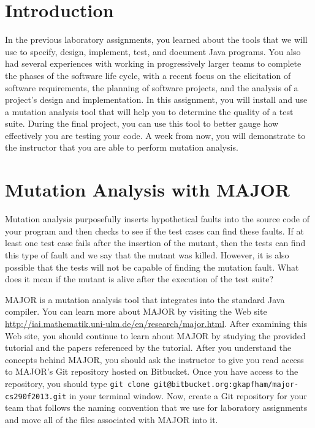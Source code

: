 

\usepackage[compact]{titlesec}



\section*{Introduction}

In the previous laboratory assignments, you learned about the tools that we will use to specify, design, implement,
test, and document Java programs.  You also had several experiences with working in progressively larger teams to
complete the phases of the software life cycle, with a recent focus on the elicitation of software requirements, the
planning of software projects, and the analysis of a project's design and implementation.  In this assignment, you will
install and use a mutation analysis tool that will help you to determine the quality of a test suite.  During the final
project, you can use this tool to better gauge how effectively you are testing your code. A week from now, you will
demonstrate to the instructor that you are able to perform mutation analysis.

\section*{Mutation Analysis with MAJOR}

Mutation analysis purposefully inserts hypothetical faults into the source code of your program and then checks to see
if the test cases can find these faults.  If at least one test case fails after the insertion of the mutant, then
the tests can find this type of fault and we say that the mutant was killed.  However, it is also possible that the
tests will not be capable of finding the mutation fault. What does it mean if the mutant is alive after the execution of
the test suite?

MAJOR is a mutation analysis tool that integrates into the standard Java compiler. You can learn more about MAJOR by
visiting the Web site \url{http://iai.mathematik.uni-ulm.de/en/research/major.html}.  After examining this Web site, you
should continue to learn about MAJOR by studying the provided tutorial and the papers referenced by the tutorial.  After
you understand the concepts behind MAJOR, you should ask the instructor to give you read access to MAJOR's Git repository
hosted on Bitbucket. Once you have access to the repository, you should type {\tt git clone
git@bitbucket.org:gkapfham/major-cs290f2013.git} in your terminal window.  Now, create a Git repository for your
team that follows the naming convention that we use for laboratory assignments and move all of the files associated with
MAJOR into it. 

